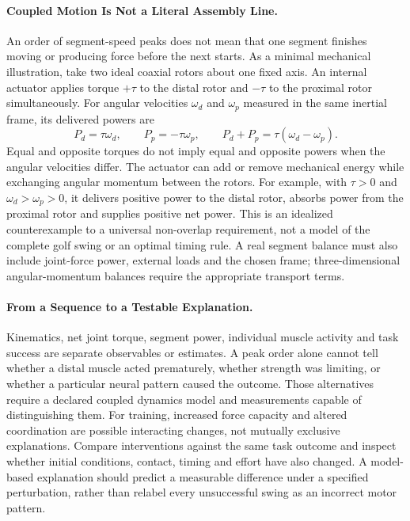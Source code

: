 \paragraph{Coupled Motion Is Not a Literal Assembly Line.}
An order of segment-speed peaks does not mean that one segment finishes moving or producing force before the next starts.
As a minimal mechanical illustration, take two ideal coaxial rotors about one fixed axis.
An internal actuator applies torque $+\tau$ to the distal rotor and $-\tau$ to the proximal rotor simultaneously.
For angular velocities $\omega_d$ and $\omega_p$ measured in the same inertial frame, its delivered powers are
\begin{equation}
 P_d=\tau\omega_d,\qquad P_p=-\tau\omega_p,\qquad
 P_d+P_p=\tau(\omega_d-\omega_p).
\end{equation}
Equal and opposite torques do not imply equal and opposite powers when the angular velocities differ.
The actuator can add or remove mechanical energy while exchanging angular momentum between the rotors.
For example, with $\tau>0$ and $\omega_d>\omega_p>0$, it delivers positive power to the distal rotor, absorbs power from the proximal rotor and supplies positive net power.
This is an idealized counterexample to a universal non-overlap requirement, not a model of the complete golf swing or an optimal timing rule.
A real segment balance must also include joint-force power, external loads and the chosen frame; three-dimensional angular-momentum balances require the appropriate transport terms.


\paragraph{From a Sequence to a Testable Explanation.}
Kinematics, net joint torque, segment power, individual muscle activity and task success are separate observables or estimates.
A peak order alone cannot tell whether a distal muscle acted prematurely, whether strength was limiting, or whether a particular neural pattern caused the outcome.
Those alternatives require a declared coupled dynamics model and measurements capable of distinguishing them.
For training, increased force capacity and altered coordination are possible interacting changes, not mutually exclusive explanations.
Compare interventions against the same task outcome and inspect whether initial conditions, contact, timing and effort have also changed.
A model-based explanation should predict a measurable difference under a specified perturbation, rather than relabel every unsuccessful swing as an incorrect motor pattern.

